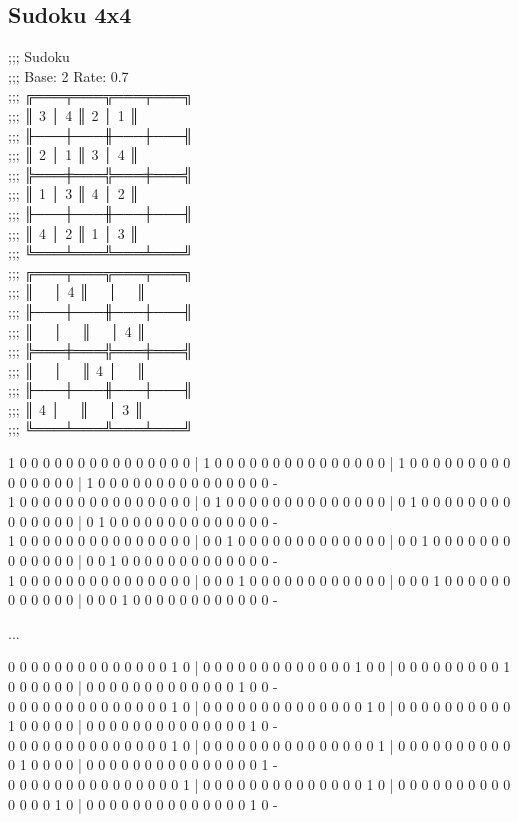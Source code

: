 \subsection{Sudoku 4x4}
\textsf{;;; Sudoku\\
;;; Base: 2 Rate: 0.7\\
;;; ╔═══╤═══╦═══╤═══╗\\
;;; ║ 3 │ 4 ║ 2 │ 1 ║\\
;;; ╟───┼───╫───┼───╢\\
;;; ║ 2 │ 1 ║ 3 │ 4 ║\\
;;; ╠═══╪═══╬═══╪═══╣\\
;;; ║ 1 │ 3 ║ 4 │ 2 ║\\
;;; ╟───┼───╫───┼───╢\\
;;; ║ 4 │ 2 ║ 1 │ 3 ║\\
;;; ╚═══╧═══╩═══╧═══╝\\
;;; ╔═══╤═══╦═══╤═══╗\\
;;; ║ \ \ │ 4 ║ \ \ │ \ \ ║\\
;;; ╟───┼───╫───┼───╢\\
;;; ║ \ \ │ \ \ ║ \ \ │ 4 ║\\
;;; ╠═══╪═══╬═══╪═══╣\\
;;; ║ \ \ │ \ \ ║ 4 │ \ \ ║\\
;;; ╟───┼───╫───┼───╢\\
;;; ║ 4 │ \ \ ║ \ \ │ 3 ║\\
;;; ╚═══╧═══╩═══╧═══╝}\\
{\scriptsize 1 0 0 0 0 0 0 0 0 0 0 0 0 0 0 0 | 1 0 0 0 0 0 0 0 0 0 0 0 0 0 0 0 | 1 0 0 0 0 0 0 0 0 0 0 0 0 0 0 0 | 1 0 0 0 0 0 0 0 0 0 0 0 0 0 0 0 -\\
1 0 0 0 0 0 0 0 0 0 0 0 0 0 0 0 | 0 1 0 0 0 0 0 0 0 0 0 0 0 0 0 0 | 0 1 0 0 0 0 0 0 0 0 0 0 0 0 0 0 | 0 1 0 0 0 0 0 0 0 0 0 0 0 0 0 0 -\\
1 0 0 0 0 0 0 0 0 0 0 0 0 0 0 0 | 0 0 1 0 0 0 0 0 0 0 0 0 0 0 0 0 | 0 0 1 0 0 0 0 0 0 0 0 0 0 0 0 0 | 0 0 1 0 0 0 0 0 0 0 0 0 0 0 0 0 -\\
1 0 0 0 0 0 0 0 0 0 0 0 0 0 0 0 | 0 0 0 1 0 0 0 0 0 0 0 0 0 0 0 0 | 0 0 0 1 0 0 0 0 0 0 0 0 0 0 0 0 | 0 0 0 1 0 0 0 0 0 0 0 0 0 0 0 0 -\\
\centerline{...}
0 0 0 0 0 0 0 0 0 0 0 0 0 0 1 0 | 0 0 0 0 0 0 0 0 0 0 0 0 0 1 0 0 | 0 0 0 0 0 0 0 0 0 1 0 0 0 0 0 0 | 0 0 0 0 0 0 0 0 0 0 0 0 0 1 0 0 -\\
0 0 0 0 0 0 0 0 0 0 0 0 0 0 1 0 | 0 0 0 0 0 0 0 0 0 0 0 0 0 0 1 0 | 0 0 0 0 0 0 0 0 0 0 1 0 0 0 0 0 | 0 0 0 0 0 0 0 0 0 0 0 0 0 0 1 0 -\\
0 0 0 0 0 0 0 0 0 0 0 0 0 0 1 0 | 0 0 0 0 0 0 0 0 0 0 0 0 0 0 0 1 | 0 0 0 0 0 0 0 0 0 0 0 1 0 0 0 0 | 0 0 0 0 0 0 0 0 0 0 0 0 0 0 0 1 -\\
0 0 0 0 0 0 0 0 0 0 0 0 0 0 0 1 | 0 0 0 0 0 0 0 0 0 0 0 0 0 0 1 0 | 0 0 0 0 0 0 0 0 0 0 0 0 0 0 1 0 | 0 0 0 0 0 0 0 0 0 0 0 0 0 0 1 0 -\\}
\newpage
